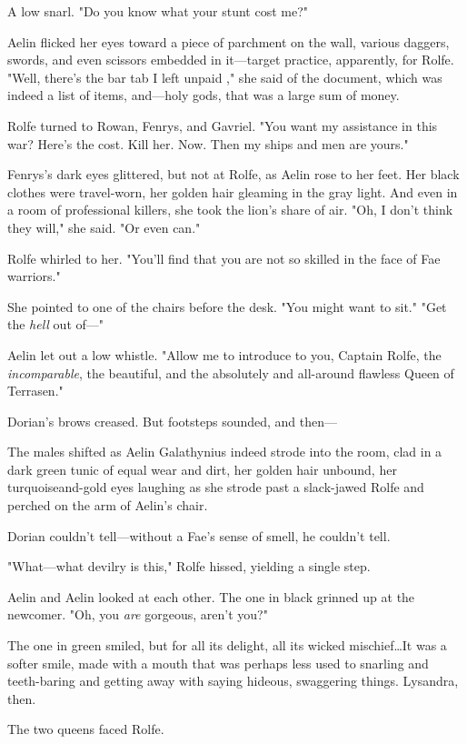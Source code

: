 A low snarl.
"Do you know what your stunt cost me?"

Aelin flicked her eyes toward a piece of parchment on the wall, various daggers, swords, and even scissors embedded in it---target practice, apparently, for Rolfe.
"Well, there's the bar tab I left unpaid  ," she said of the document, which was indeed a list of items, and---holy gods, that was a large sum of money.

Rolfe turned to Rowan, Fenrys, and Gavriel.
"You want my assistance in this war?
Here's the cost.
Kill her.
Now.
Then my ships and men are yours."

Fenrys's dark eyes glittered, but not at Rolfe, as Aelin rose to her feet.
Her black clothes were travel-worn, her golden hair gleaming in the gray light.
And even in a room of professional killers, she took the lion's share of air.
"Oh, I don't think they will," she said.
"Or even can."

Rolfe whirled to her.
"You'll find that you are not so skilled in the face of Fae warriors."

She pointed to one of the chairs before the desk.
"You might want to sit."
"Get the \emph{hell} out of---"

Aelin let out a low whistle.
"Allow me to introduce to you, Captain Rolfe, the \emph{incomparable}, the beautiful, and the absolutely and all-around flawless Queen of Terrasen."

Dorian's brows creased.
But footsteps sounded, and then---

The males shifted as Aelin Galathynius indeed strode into the room, clad in a dark green tunic of equal wear and dirt, her golden hair unbound, her turquoiseand-gold eyes laughing as she strode past a slack-jawed Rolfe and perched on the arm of Aelin's chair.

Dorian couldn't tell---without a Fae's sense of smell, he couldn't tell.

"What---what devilry is this," Rolfe hissed, yielding a single step.

Aelin and Aelin looked at each other.
The one in black grinned up at the newcomer.
"Oh, you \emph{are} gorgeous, aren't you?"

The one in green smiled, but for all its delight, all its wicked mischief\ldots It was a softer smile, made with a mouth that was perhaps less used to snarling and teeth-baring and getting away with saying hideous, swaggering things.
Lysandra, then.

The two queens faced Rolfe.


